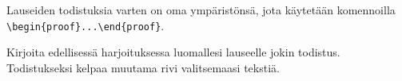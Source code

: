     Lauseiden todistuksia varten on oma ympäristönsä, jota käytetään komennoilla \lstinline-\begin{proof}...\end{proof}-.
    \begin{harj}
        Kirjoita edellisessä harjoituksessa luomallesi lauseelle jokin todistus. Todistukseksi kelpaa muutama rivi valitsemaasi tekstiä.
    \end{harj}
